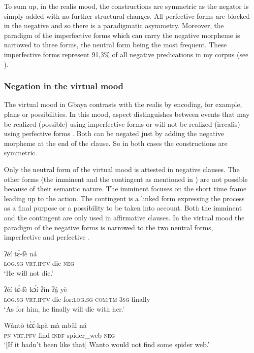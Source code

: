\documentclass[output=paper,colorlinks=true, citecolor=brown]{langscibook}
\begin{document}
To sum up, in the realis mood, the constructions are symmetric as the negator is simply added with no further structural changes. All perfective forms are blocked in the negative and so there is a paradigmatic asymmetry. Moreover, the paradigm of the imperfective forms which can carry the negative morpheme is narrowed to three forms, the neutral form being the most frequent. These imperfective forms represent 91,3\% of all negative predications in my corpus (see ).

\subsubsection{Negation in the virtual mood}\label{sec:gba:2.1.2} 

The virtual mood in Gbaya contrasts with the realis by encoding, for example, plans or possibilities. In this mood, aspect distinguishes between events that may be realized (possible) using imperfective forms  or will not be realized (irrealis) using perfective forms . Both can be negated just by adding the negative morpheme at the end of the clause. So in both cases the constructions are symmetric. 

Only the neutral form of the virtual mood is attested in negative clauses. The other forms (the imminent and the contingent as mentioned in ) are not possible because of their semantic nature. The imminent focuses on the short time frame leading up to the action. The contingent is a linked form expressing the process as a final purpose or a possibility to be taken into account. Both the imminent and the contingent are only used in affirmative clauses. In the virtual mood the paradigm of the negative forms is narrowed to the two neutral forms, imperfective  and perfective .

\ea\label{ex:gba:10}
    \gll ʔéí tɛ́-fè ná  \\ 
          \textsc{log.sg} \textsc{vrt.ipfv}-die \textsc{neg}  \\
    \glt ‘He will not die.’
\z 

\ea\label{ex:gba:11}
    \gll ʔéí tɛ́-fè kɔ́í ʔín ʔá̰    yè \\ 
         \textsc{log.sg} \textsc{vrt.ipfv}-die for:\textsc{log.sg} \textsc{com:tm} \textsc{3sg} finally \\
    \glt ‘As for him, he finally will    die with her.’
\z 

\ea\label{ex:gba:12}
    \gll Wàntò tɛ̀ɛ́-kpà mà mbûl ná \\ 
         \textsc{pn} \textsc{vrt.pfv}-find \textsc{indf} spider\_web \textsc{neg} \\
    \glt ‘[If it hadn't been like that] Wanto would not find some spider web.’
\z 
 
\end{document}
